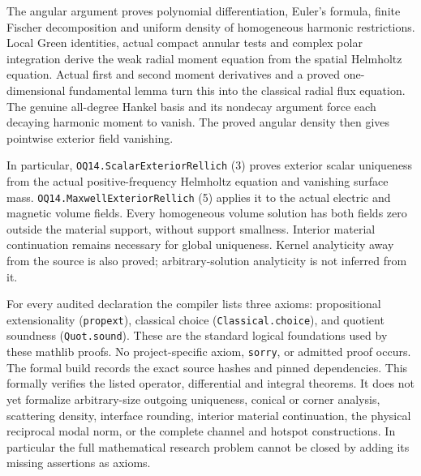 The angular argument proves polynomial differentiation, Euler's formula,
finite Fischer decomposition and uniform density of homogeneous harmonic
restrictions. Local Green identities, actual compact annular tests and
complex polar integration derive the weak radial moment equation from
the spatial Helmholtz equation. Actual first and second moment derivatives
and a proved one-dimensional fundamental lemma turn this into the
classical radial flux equation. The genuine all-degree Hankel basis and
its nondecay argument force each decaying harmonic moment to vanish.
The proved angular density then gives pointwise exterior field vanishing.

In particular, \texttt{OQ14.\allowbreak ScalarExteriorRellich} (3)
proves exterior scalar uniqueness from the actual positive-frequency
Helmholtz equation and vanishing surface mass.
\texttt{OQ14.\allowbreak MaxwellExteriorRellich} (5) applies it to the
actual electric and magnetic volume fields. Every homogeneous volume
solution has both fields zero outside the material support, without
support smallness. Interior material continuation remains necessary for
global uniqueness. Kernel analyticity away from the source is also
proved; arbitrary-solution analyticity is not inferred from it.

For every audited declaration the compiler lists three axioms: propositional
extensionality (\texttt{propext}), classical choice
(\texttt{Classical.choice}), and quotient soundness (\texttt{Quot.sound}).
These are the standard logical foundations used by these mathlib proofs. No
project-specific axiom, \texttt{sorry}, or admitted proof occurs. The
formal build records the exact source hashes and pinned dependencies.
This formally verifies the listed operator, differential and integral
theorems. It does not yet formalize arbitrary-size outgoing uniqueness,
conical or corner analysis, scattering density, interface rounding,
interior material continuation, the physical
reciprocal modal norm, or the complete channel and hotspot constructions.
In particular the full mathematical research problem cannot be closed by
adding its missing assertions as axioms.

